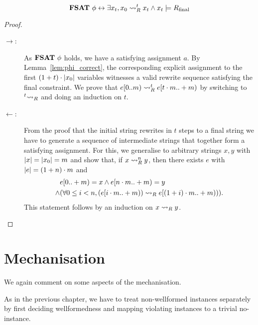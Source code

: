 \begin{theorem}
  \[\normalfont\textbf{FSAT}~\phi \leftrightarrow \exists x_t, x_0 \rightsquigarrow_{R}^t x_t \land x_t \models R_{\text{final}} \]
\end{theorem}
\begin{proof}\leavevmode
  \begin{description}
    \item[$\rightarrow$:]
      As $\normalfont\textbf{FSAT}{}~\phi$ holds, we have a satisfying assignment $a$. 
      By Lemma~\ref{lem:phi_correct}, the corresponding explicit assignment to the first $(1 +{t}) \cdot |x_0|$ variables witnesses a valid rewrite sequence satisfying the final constraint. 
      We prove that $e[0 ..m) \rightsquigarrow_{R}^t e[t \cdot m ..+ m)$ by switching to $\prescript{t}{}{\rightsquigarrow_{R}}$ and doing an induction on $t$.
    \item[$\leftarrow$:]
      From the proof that the initial string rewrites in $t$ steps to a final string we have to generate a sequence of intermediate strings that together form a satisfying assignment. 
      For this, we generalise to arbitrary strings $x, y$ with $|x| = |x_0| = m$ and show that, if $x \rightsquigarrow_{R}^n y$, then there exists $e$ with $|e| = (1 +{n}) \cdot m$ and 
      \begin{align*}
        &e[0..+ m) = x \land e[n \cdot m ..+ m) = y \\
        \land & (\forall 0 \le i < n, (e[i \cdot m ..+ m)) \rightsquigarrow_{R} e[(1 +{i}) \cdot m ..+ m))).
      \end{align*}
      This statement follows by an induction on $x \rightsquigarrow_{R} y$.
  \end{description}
\end{proof}

\section{Mechanisation}
We again comment on some aspects of the mechanisation.

As in the previous chapter, we have to treat non-wellformed instances separately by first deciding wellformedness and mapping violating instances to a trivial no-instance. 

